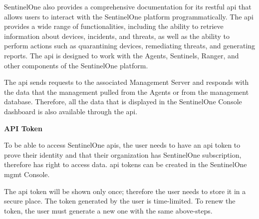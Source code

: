 \begin{multicols}{2}
      SentinelOne also provides a comprehensive documentation for its \acrshort{rest}ful \acrshort{api} that allows users to interact
      with the SentinelOne platform programmatically. The \acrshort{api} provides a wide range of functionalities, including the ability
      to retrieve information about devices, incidents, and threats, as well as the ability to perform actions such as quarantining devices,
      remediating threats, and generating reports. The \acrshort{api} is designed to work with the Agents, Sentinels, Ranger, and other
      components of the SentinelOne platform.

      The \acrshort{api} sends requests to the associated Management Server and responds with the data that the management pulled from
      the Agents or from the management database. Therefore, all the data that is displayed in the SentinelOne Console dashboard is also
      available through the \acrshort{api}.

      \textbf{API Token}

      To be able to access SentinelOne \acrshort{api}s, the user needs to have an \acrshort{api} token to prove their
      identity and that their organization has SentinelOne subscription, therefore has right to access data.
      \acrshort{api} tokens can be created in the SentinelOne \acrshort{mgmt} Console.

      The \acrshort{api} token will be shown only once; therefore the user needs to store it in a secure place.
      The token generated by the user is time-limited. To renew the token, the user must generate a new one with
      the same above-steps.


\end{multicols}
